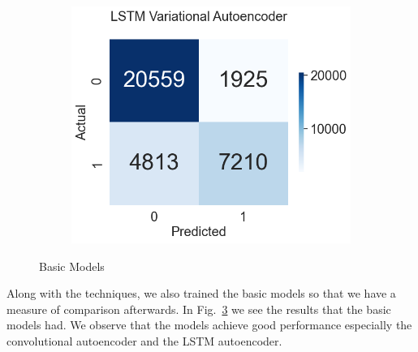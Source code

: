 \documentclass[a4paper,12pt]{report}
\theoremstyle{definitionNODot}
\begin{document}
\begin{figure}[H]
\begin{subfigure}[b]{0.35\textwidth}
			\label{fig:anomaly_by_lstm_ae}
		\end{subfigure}
		\medskip
		\begin{subfigure}[b]{0.35\textwidth}
			\centering
			\includegraphics[width=\textwidth]{anomaly_by_lstm_vae.png}
			
			\label{fig:anomaly_by_lstm_vae}
		\end{subfigure}
		\caption{Basic Models}
		\label{fig:basicmodelsconfusion}
	\end{figure}
	
	Along with the techniques, we also trained the basic models so that we have a measure of comparison afterwards. In Fig.~\ref{fig:basicmodelsconfusion} we see the results that the basic models had. We observe that the models achieve good performance especially the convolutional autoencoder and the LSTM autoencoder.
	
\end{document}

